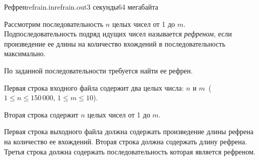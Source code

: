 \begin{problem}{Рефрен}{refrain.in}{refrain.out}{3 секунды}{64 мегабайта}

Рассмотрим последовательность $n$ целых чисел от 1 до $m$. 
Подпоследовательность подряд
идущих чисел называется \emph{рефреном}, если произведение ее длины
на количество вхождений в последовательность максимально. 

По заданной последовательности требуется найти ее рефрен.

\InputFile

Первая строка входного файла содержит два целых числа: $n$ и $m$\
($1 \le n \le 150\,000$, $1 \le m \le 10$).

Вторая строка содержит $n$ целых чисел от 1 до $m$.

\OutputFile

Первая строка выходного файла должна содержать произведение
длины рефрена на количество ее вхождений. Вторая строка должна
содержать длину рефрена. Третья строка должна содержать 
последовательность которая является рефреном.

\Example

\begin{example}%
%
\end{example}

\end{problem}
